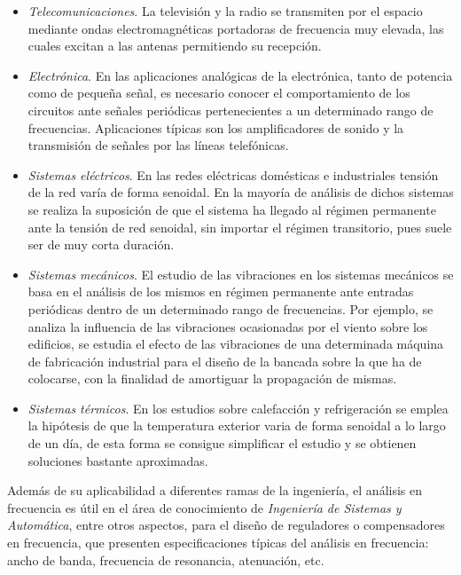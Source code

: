 \begin{itemize}

	\item \textsl{Telecomunicaciones}. La televisión y la radio se transmiten por el espacio mediante
	ondas electromagnéticas portadoras de frecuencia muy elevada, las cuales excitan a las antenas
	permitiendo su recepción.
	
	\item \textsl{Electrónica}. En las aplicaciones analógicas de la electrónica, tanto de potencia como
	de pequeña señal, es necesario conocer el comportamiento de los circuitos ante señales periódicas
	pertenecientes a un determinado rango de frecuencias. Aplicaciones típicas son los amplificadores de
	sonido y la transmisión de señales por las líneas telefónicas.
	
	\item \textsl{Sistemas eléctricos}. En las redes eléctricas domésticas e industriales tensión de la
	red varía de forma senoidal. En la mayoría de análisis de dichos sistemas se realiza la suposición de
	que el sistema ha llegado al régimen permanente ante la tensión de red senoidal, sin importar el
	régimen transitorio, pues suele ser de muy corta duración.
	
	\item \textsl{Sistemas mecánicos}. El estudio de las vibraciones en los sistemas mecánicos se basa en
	el análisis de los mismos en régimen permanente ante entradas periódicas dentro de un determinado
	rango de frecuencias. Por ejemplo, se analiza la influencia de las vibraciones ocasionadas por el
	viento sobre los edificios, se estudia el efecto de las vibraciones de una determinada máquina de
	fabricación industrial para el diseño de la bancada sobre la que ha de colocarse, con la finalidad de
	amortiguar la propagación de mismas.
	
	\item \textsl{Sistemas  térmicos}. En los estudios sobre calefacción y refrigeración se emplea la
	hipótesis de que la temperatura exterior varia de forma senoidal a lo largo de un día, de esta forma
	se consigue simplificar el estudio y se obtienen soluciones bastante aproximadas.

\end{itemize}


Además de su aplicabilidad a diferentes ramas de la ingeniería, el análisis en frecuencia es
útil en el área de conocimiento de \textsl{Ingeniería de Sistemas y Automática}, entre otros
aspectos, para el diseño de reguladores o compensadores en frecuencia, que presenten
especificaciones típicas del análisis en frecuencia: ancho de banda, frecuencia de resonancia,
atenuación, etc.

